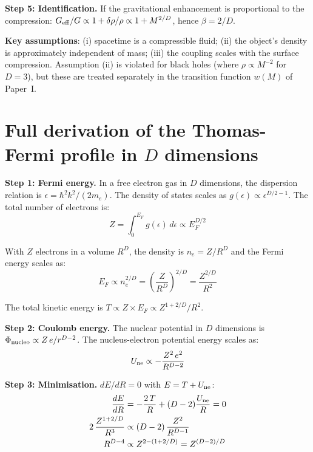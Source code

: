 \documentclass[10pt,a4paper]{article}
\begin{document}
\textbf{Step 5: Identification.} If the gravitational enhancement is proportional to the compression: $G_{\rm eff}/G \propto 1 + \delta\rho/\rho \propto 1 + M^{2/D}$, hence $\beta = 2/D$.

\textbf{Key assumptions}: (i) spacetime is a compressible fluid; (ii) the object's density is approximately independent of mass; (iii) the coupling scales with the surface compression. Assumption (ii) is violated for black holes (where $\rho \propto M^{-2}$ for $D = 3$), but these are treated separately in the transition function $w(M)$ of Paper~I.


\section{Full derivation of the Thomas-Fermi profile in $D$ dimensions}\label{app:TF}

\textbf{Step 1: Fermi energy.} In a free electron gas in $D$ dimensions, the dispersion relation is $\epsilon = \hbar^2k^2/(2m_e)$. The density of states scales as $g(\epsilon) \propto \epsilon^{D/2-1}$. The total number of electrons is:
\begin{equation}
Z = \int_0^{E_F} g(\epsilon)\,d\epsilon \propto E_F^{D/2}
\end{equation}

With $Z$ electrons in a volume $R^D$, the density is $n_e = Z/R^D$ and the Fermi energy scales as:
\begin{equation}
E_F \propto n_e^{2/D} = \left(\frac{Z}{R^D}\right)^{2/D} = \frac{Z^{2/D}}{R^2}
\end{equation}

The total kinetic energy is $T \propto Z \times E_F \propto Z^{1+2/D}/R^2$.

\textbf{Step 2: Coulomb energy.} The nuclear potential in $D$ dimensions is $\Phi_{\rm nucleo} \propto Z\,e/r^{D-2}$. The nucleus-electron potential energy scales as:
\begin{equation}
U_{\rm ne} \propto -\frac{Z^2\,e^2}{R^{D-2}}
\end{equation}

\textbf{Step 3: Minimisation.} $dE/dR = 0$ with $E = T + U_{\rm ne}$:
\begin{align}
\frac{dE}{dR} &= -\frac{2\,T}{R} + (D-2)\frac{U_{\rm ne}}{R} = 0 \\
2\,\frac{Z^{1+2/D}}{R^3} &\propto (D-2)\,\frac{Z^2}{R^{D-1}} \\
R^{D-4} &\propto Z^{2-(1+2/D)} = Z^{(D-2)/D}
\end{align}
\end{document}
